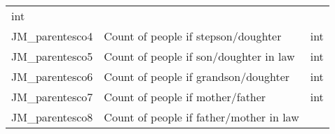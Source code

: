 \documentclass[11pt]{article}
\begin{document}
\begin{longtable}[]{@{}lll@{}}
\begin{minipage}[t]{0.16\columnwidth}
int\strut
\end{minipage}\tabularnewline
\begin{minipage}[t]{0.63\columnwidth}\raggedright\strut
JM\_parentesco4\strut
\end{minipage} & \begin{minipage}[t]{0.12\columnwidth}\raggedright\strut
Count of people if stepson/doughter\strut
\end{minipage} & \begin{minipage}[t]{0.16\columnwidth}\raggedright\strut
int\strut
\end{minipage}\tabularnewline
\begin{minipage}[t]{0.63\columnwidth}\raggedright\strut
JM\_parentesco5\strut
\end{minipage} & \begin{minipage}[t]{0.12\columnwidth}\raggedright\strut
Count of people if son/doughter in law\strut
\end{minipage} & \begin{minipage}[t]{0.16\columnwidth}\raggedright\strut
int\strut
\end{minipage}\tabularnewline
\begin{minipage}[t]{0.63\columnwidth}\raggedright\strut
JM\_parentesco6\strut
\end{minipage} & \begin{minipage}[t]{0.12\columnwidth}\raggedright\strut
Count of people if grandson/doughter\strut
\end{minipage} & \begin{minipage}[t]{0.16\columnwidth}\raggedright\strut
int\strut
\end{minipage}\tabularnewline
\begin{minipage}[t]{0.63\columnwidth}\raggedright\strut
JM\_parentesco7\strut
\end{minipage} & \begin{minipage}[t]{0.12\columnwidth}\raggedright\strut
Count of people if mother/father\strut
\end{minipage} & \begin{minipage}[t]{0.16\columnwidth}\raggedright\strut
int\strut
\end{minipage}\tabularnewline
\begin{minipage}[t]{0.63\columnwidth}\raggedright\strut
JM\_parentesco8\strut
\end{minipage} & \begin{minipage}[t]{0.12\columnwidth}\raggedright\strut
Count of people if father/mother in law\strut
\end{minipage} & \begin{minipage}[t]{0.16\columnwidth}\raggedright\strut

\end{minipage}
\end{longtable}
\end{document}
